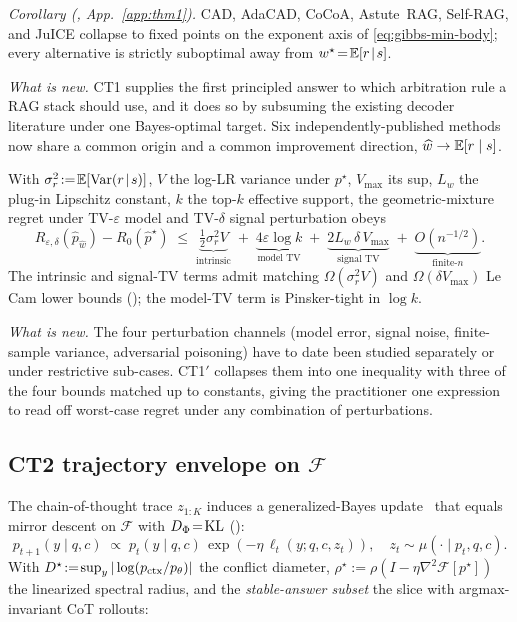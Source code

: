 \noindent\emph{Corollary (, App.~\ref{app:thm1}).} CAD, AdaCAD, CoCoA, Astute~RAG, Self-RAG, and JuICE collapse to fixed points on the exponent axis of \eqref{eq:gibbs-min-body}; every alternative is strictly suboptimal away from $w^\star\!=\!\mathbb{E}[r\!\mid\!s]$.\label{cor:special-cases-body}

\textit{What is new.} CT1 supplies the first principled answer to which arbitration rule a RAG stack should use, and it does so by subsuming the existing decoder literature under one Bayes-optimal target. Six independently-published methods now share a common origin and a common improvement direction, $\widehat w \to \mathbb{E}[r\mid s]$.

\begin{theorem}
\label{thm:ct1prime-body}
With $\sigma_r^{2}\!:=\!\mathbb{E}[\operatorname{Var}(r\!\mid\!s)]$, $V$ the log-LR variance under $p^\star$, $V_{\max}$ its sup, $L_w$ the plug-in Lipschitz constant, $k$ the top-$k$ effective support, the geometric-mixture regret under TV-$\varepsilon$ model and TV-$\delta$ signal perturbation obeys
\begin{equation}
R_{\varepsilon,\delta}(\hat p_{\hat w})\!-\!R_0(\hat p^\star)
\;\le\;
\underbrace{\tfrac12\sigma_r^{2}V}_{\text{intrinsic}} \;+\; \underbrace{4\varepsilon\log k}_{\text{model TV}} \;+\; \underbrace{2L_w\,\delta\,V_{\max}}_{\text{signal TV}} \;+\; \underbrace{O(n^{-1/2})}_{\text{finite-$n$}}.
\label{eq:robustness-envelope}
\end{equation}
The intrinsic and signal-TV terms admit matching $\Omega(\sigma_r^2 V)$ and $\Omega(\delta V_{\max})$ Le Cam lower bounds (); the model-TV term is Pinsker-tight in $\log k$.
\end{theorem}

\textit{What is new.} The four perturbation channels (model error, signal noise, finite-sample variance, adversarial poisoning) have to date been studied separately or under restrictive sub-cases. CT1$'$ collapses them into one inequality with three of the four bounds matched up to constants, giving the practitioner one expression to read off worst-case regret under any combination of perturbations.

\subsection{CT2 trajectory envelope on $\mathcal{F}$}
\label{sec:ct2}\label{sec:thm3}

The chain-of-thought trace $z_{1:K}$ induces a generalized-Bayes update~\citep{bissiri2016} that equals mirror descent on $\mathcal{F}$ with $D_\Phi\!=\!\operatorname{KL}$ ():
\begin{equation}
p_{t+1}(y\mid q,c)\;\propto\;p_t(y\mid q,c)\,\exp\!\left(-\eta\,\ell_t(y;q,c,z_t)\right),\quad z_t\sim\mu(\cdot\mid p_t,q,c).
\label{eq:gen-bayes}
\end{equation}
With $D^\star\!:=\!\sup_y|\log(p_{\mathrm{ctx}}/p_\theta)|$ the conflict diameter, $\rho^\star\!:=\!\rho(I\!-\!\eta\nabla^{2}\mathcal{F}[p^\star])$ the linearized spectral radius, and the \emph{stable-answer subset} the slice with argmax-invariant CoT rollouts:

